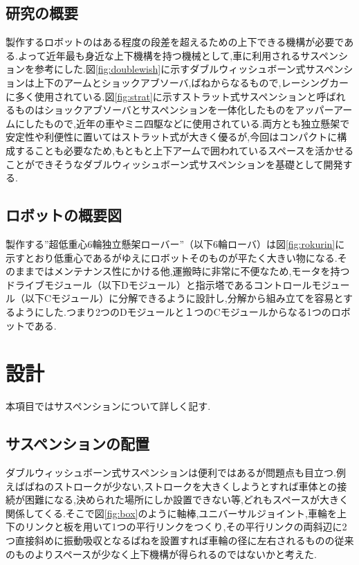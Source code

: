 \documentclass[11pt]{jsarticle}
\begin{document}
\subsection{研究の概要}
製作するロボットのはある程度の段差を超えるための上下できる機構が必要である.よって近年最も身近な上下機構を持つ機械として,車に利用されるサスペンションを参考にした.図\ref{fig:doublewish}に示すダブルウィッシュボーン式サスペンションは上下のアームとショックアブソーバ,ばねからなるもので,レーシングカーに多く使用されている.図\ref{fig:strat}に示すストラット式サスペンションと呼ばれるものはショックアブソーバとサスペンションを一体化したものをアッパーアームにしたもので,近年の車やミニ四駆などに使用されている.両方とも独立懸架で安定性や利便性に置いてはストラット式が大きく優るが,今回はコンパクトに構成することも必要なため,もともと上下アームで囲われているスペースを活かせることができそうなダブルウィッシュボーン式サスペンションを基礎として開発する.

\subsection{ロボットの概要図}
製作する”超低重心6輪独立懸架ローバー”（以下6輪ローバ）は図\ref{fig:rokurin}に示すとおり低重心であるがゆえにロボットそのものが平たく大きい物になる.そのままではメンテナンス性にかける他,運搬時に非常に不便なため,モータを持つドライブモジュール（以下Dモジュール）と指示塔であるコントロールモジュール（以下Cモジュール）に分解できるように設計し,分解から組み立てを容易とするようにした.つまり2つのDモジュールと１つのCモジュールからなる1つのロボットである.

\section{設計}
本項目ではサスペンションについて詳しく記す.


\subsection{サスペンションの配置}
ダブルウィッシュボーン式サスペンションは便利ではあるが問題点も目立つ.例えばばねのストロークが少ない,ストロークを大きくしようとすれば車体との接続が困難になる,決められた場所にしか設置できない等,どれもスペースが大きく関係してくる.そこで図\ref{fig:box}のように軸棒,ユニバーサルジョイント,車輪を上下のリンクと板を用いて1つの平行リンクをつくり,その平行リンクの両斜辺に2つ直接斜めに振動吸収となるばねを設置すれば車輪の径に左右されるものの従来のものよりスペースが少なく上下機構が得られるのではないかと考えた.
\end{document}
